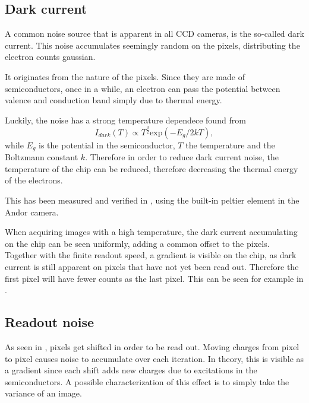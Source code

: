 \subsection{Dark current}
A common noise source that is apparent in all CCD cameras, is the so-called dark current. This noise accumulates seemingly random on the pixels, distributing the electron counts gaussian.

It originates from the nature of the pixels. Since they are made of semiconductors, once in a while, an electron can pass the potential between valence and conduction band simply due to thermal energy.

Luckily, the noise has a strong temperature dependece found from
\begin{equation}
I_{dark}(T) \propto T^{\frac{3}{2}} \mathrm{exp}(-E_g/2kT),
\end{equation}
while $E_g$ is the potential in the semiconductor, $T$ the temperature and the Boltzmann constant $k$.
Therefore in order to reduce dark current noise, the temperature of the chip can be reduced, therefore decreasing the thermal energy of the electrons.

This has been measured and verified in , using the built-in peltier element in the Andor camera.

When acquiring images with a high temperature, the dark current accumulating on the chip can be seen uniformly, adding a common offset to the pixels. Together with the finite readout speed, a gradient is visible on the chip, as dark current is still apparent on pixels that have not yet been read out. Therefore the first pixel will have fewer counts as the last pixel.
This can be seen for example in .


\newpage
\subsection{Readout noise}
As seen in , pixels get shifted in order to be read out. Moving charges from pixel to pixel causes noise to accumulate over each iteration. In theory, this is visible as a gradient since each shift adds new charges due to excitations in the semiconductors. A possible characterization of this effect is to simply take the variance of an image.

